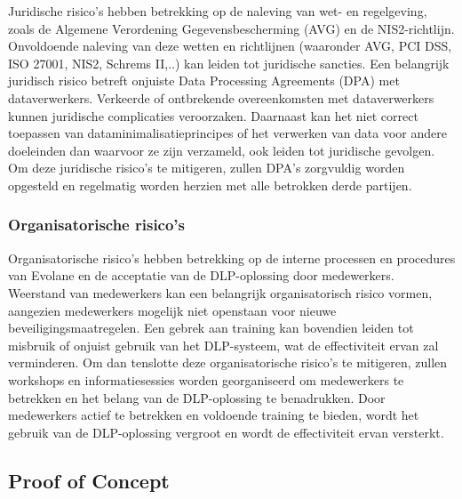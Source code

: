 Juridische risico's hebben betrekking op de naleving van wet- en regelgeving, zoals de Algemene Verordening Gegevensbescherming (AVG) en de NIS2-richtlijn.
Onvoldoende naleving van deze wetten en richtlijnen (waaronder AVG, PCI DSS, ISO 27001, NIS2, Schrems II,..) kan leiden tot juridische sancties. 
Een belangrijk juridisch risico betreft onjuiste Data Processing Agreements (DPA) met dataverwerkers. 
Verkeerde of ontbrekende overeenkomsten met dataverwerkers kunnen juridische complicaties veroorzaken. 
Daarnaast kan het niet correct toepassen van dataminimalisatieprincipes of het verwerken van data voor andere doeleinden dan waarvoor ze zijn verzameld, 
ook leiden tot juridische gevolgen. 
Om deze juridische risico's te mitigeren, zullen DPA's zorgvuldig worden opgesteld en regelmatig worden herzien met alle betrokken derde partijen. 

\subsubsection{Organisatorische risico's}

Organisatorische risico's hebben betrekking op de interne processen en procedures van Evolane en de acceptatie van de DLP-oplossing door medewerkers. 
Weerstand van medewerkers kan een belangrijk organisatorisch risico vormen, aangezien medewerkers mogelijk niet openstaan voor nieuwe beveiligingsmaatregelen. 
Een gebrek aan training kan bovendien leiden tot misbruik of onjuist gebruik van het DLP-systeem, wat de effectiviteit ervan zal verminderen. 
Om dan tenslotte deze organisatorische risico's te mitigeren, zullen workshops en informatiesessies worden georganiseerd om medewerkers te betrekken en het belang van de DLP-oplossing te benadrukken. 
Door medewerkers actief te betrekken en voldoende training te bieden, wordt het gebruik van de DLP-oplossing vergroot en wordt de effectiviteit ervan versterkt.

\subsection{Proof of Concept}%

